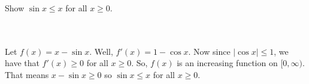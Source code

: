 Show $\sin x\leq x$ for all $x\geq0$.\\\\

\begin{solution}\renewcommand{\qedsymbol}{}\ \\
    Let $f(x)=x-\sin x$. Well, $f'(x)=1-\cos x$. Now since $|\cos x|\leq1$, we have that $f'(x)\geq0$
    for all $x\geq0$. So, $f(x)$ is an increasing function on $[0,\infty)$. That means $x-\sin x\geq0$
    so $\sin x\leq x$ for all $x\geq0$.
\end{solution}